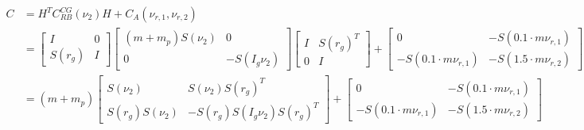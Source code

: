 \documentclass[12pt,a4]{article}
\begin{document}
\begin{align}
	C & = H^T C_{RB}^{CG}(\nu_2) H  + C_A(\nu_{r,1},\nu_{r,2}) \\
	  & =
	\begin{bmatrix} I & 0 \\ S(r_g)  & I \end{bmatrix}
	\begin{bmatrix}
		(m+m_p) S(\nu_2) & 0             \\
		0                & -S(I_g \nu_2)
	\end{bmatrix}
	\begin{bmatrix} I & S(r_g)^T\\ 0  & I \end{bmatrix}
	+
	\begin{bmatrix}
		0                        & -S(0.1 \cdot m\nu_{r,1}) \\
		-S(0.1 \cdot m\nu_{r,1}) & -S(1.5 \cdot m\nu_{r,2})
	\end{bmatrix}                                 \\
	  & =
	(m+m_p)
	\begin{bmatrix}
		S(\nu_2)        & S(\nu_2)  S(r_g)^T          \\
		S(r_g) S(\nu_2) & -S(r_g)S(I_g \nu_2)S(r_g)^T
	\end{bmatrix}
	+
	\begin{bmatrix}
		0                        & -S(0.1 \cdot m\nu_{r,1}) \\
		-S(0.1 \cdot m\nu_{r,1}) & -S(1.5 \cdot m\nu_{r,2})
	\end{bmatrix}
\end{align}
\end{document}
